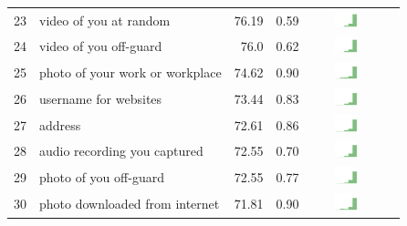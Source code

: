 \begin{table}[t]
\begin{center}
\begin{tabular}{| r | l | r | r | r | r |}
23 & video of you at random & 76.19 & 0.59 & \includegraphics[width = 2cm, height = 0.5cm]{tex-inputs/table-images/tookvideosofyou(withaninward-facingcamera)atrandomcombined} \\ 
24 & video of you off-guard & 76.0 & 0.62 & \includegraphics[width = 2cm, height = 0.5cm]{tex-inputs/table-images/tookavideoofyouoff-guardcombined} \\ 
25 & photo of your work or workplace & 74.62 & 0.90 & \includegraphics[width = 2cm, height = 0.5cm]{tex-inputs/table-images/tookphotosatwork(withanoutward-facingcamera)combined} \\ 
26 & username for websites & 73.44 & 0.83 &  \includegraphics[width = 2cm, height = 0.5cm]{tex-inputs/table-images/learnedyourusernameforwebsitescombined} \\ 
27 & address & 72.61 & 0.86 & \includegraphics[width = 2cm, height = 0.5cm]{tex-inputs/table-images/learnedyouraddresscombined} \\ 
28 & audio recording you captured & 72.55  & 0.70 & \includegraphics[width = 2cm, height = 0.5cm]{tex-inputs/table-images/copiedanduploadedaudiorecordingsyoumadeonyourdevicecombined} \\ 
29 & photo of you off-guard & 72.55 & 0.77 & \includegraphics[width = 2cm, height = 0.5cm]{tex-inputs/table-images/tookaphotoofyouoff-guardcombined} \\ 
30 & photo downloaded from internet & 71.81 & 0.90 & \includegraphics[width = 2cm, height = 0.5cm]{tex-inputs/table-images/sharedphotosyoudownloadedfromtheinternetsavedonyourdevicecombined} \\ 

\end{tabular}
\end{center}
\end{table}
